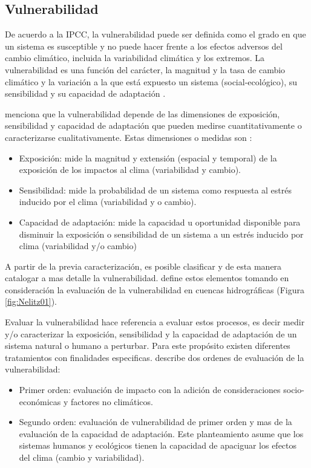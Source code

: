 \documentclass[12pt]{article}
\begin{document}
\subsection{Vulnerabilidad}

De acuerdo a la IPCC, la vulnerabilidad puede ser definida como el grado en que un sistema es susceptible y no puede hacer frente a los efectos adversos del cambio climático, incluida la variabilidad climática y los extremos. La vulnerabilidad es una función del carácter, la magnitud y la tasa de cambio climático y la variación a la que está expuesto un sistema (social-ecológico), su sensibilidad y su capacidad de adaptación \citep{parry2007climate}.

\citet{nelitz2013tools} menciona que la vulnerabilidad depende de las dimensiones de exposición, sensibilidad y capacidad de adaptación que pueden medirse cuantitativamente o caracterizarse cualitativamente. Estas dimensiones o medidas son \citep{glick2011scanning,fussel2006climate}:

\begin{itemize}
    \item Exposición: mide la magnitud y extensión (espacial y temporal) de la exposición de los impactos al clima (variabilidad y cambio).
    \item Sensibilidad: mide la probabilidad de un sistema como respuesta al estrés inducido por el clima (variabilidad y o cambio).
    \item Capacidad de adaptación: mide la capacidad u oportunidad disponible para disminuir la exposición o sensibilidad de un sistema a un estrés inducido por clima (variabilidad y/o cambio)
\end{itemize}

A partir de la previa caracterización, es posible clasificar y de esta manera catalogar a mas detalle la vulnerabilidad. \citet{nelitz2013tools} define estos elementos tomando en consideración la evaluación de la vulnerabilidad en cuencas hidrográficas (Figura \ref{fig:Nelitz01}).

Evaluar la vulnerabilidad hace referencia a evaluar estos procesos, es decir medir y/o caracterizar la exposición, sensibilidad y la capacidad de adaptación de un sistema natural o humano a perturbar. Para este propósito existen diferentes tratamientos con finalidades especificas. \citet{nelitz2013tools} describe dos ordenes de evaluación de la vulnerabilidad:

\begin{itemize}
    \item Primer orden: evaluación de impacto con la adición de consideraciones socio-económicas y factores no climáticos.
    \item Segundo orden: evaluación de vulnerabilidad de primer orden y mas de la evaluación de la capacidad de adaptación. Este planteamiento asume que los sistemas humanos y ecológicos tienen la capacidad de apaciguar los efectos del clima (cambio y variabilidad).
\end{itemize}
\end{document}
